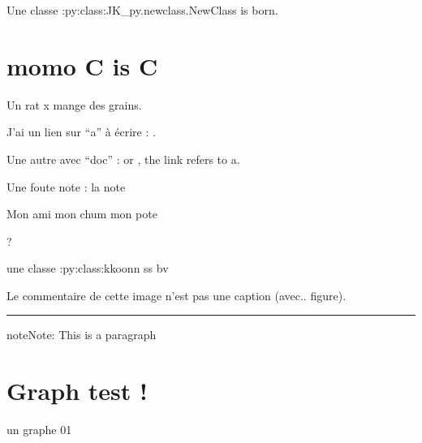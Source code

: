 \documentclass[letterpaper,10pt,english]{sphinxmanual}
\let\sphinxpxdimen\pdfpxdimen\else\newdimen\sphinxpxdimen
\begin{document}
Une classe :py:class:JK\_py.newclass.NewClass is born.


\chapter{momo C is C}
\label{\detokenize{c:momo-c-is-c}}\label{\detokenize{c::doc}}
Un rat x mange des grains.

J’ai un lien sur “a” à écrire : {\hyperref[\detokenize{a:lien-sur-a}]{}}.

Une autre avec “doc” : {\hyperref[\detokenize{a::doc}]{}} or {\hyperref[\detokenize{a::doc}]{}}, the link refers to a.

Une foute note : la note %
\begin{footnote}[1]\sphinxAtStartFootnote
Mon ami mon chum mon pote
%
\end{footnote} ?

une classe :py:class:kkoonn ss bv

\noindent\sphinxincludegraphics[width=200\sphinxpxdimen]{{jn_fonction}.png}

Le commentaire de cette image n’est pas une caption (avec.. figure).


\bigskip\hrule\bigskip


\begin{sphinxadmonition}{note}{Note:}
This is a paragraph
\end{sphinxadmonition}


\chapter{Graph test !}
\label{\detokenize{test_graphs:graph-test}}\label{\detokenize{test_graphs::doc}}
un graphe 01

\noindent{}

\noindent{}

\noindent{}

\noindent{}

\noindent{}

\noindent{}
\end{document}
